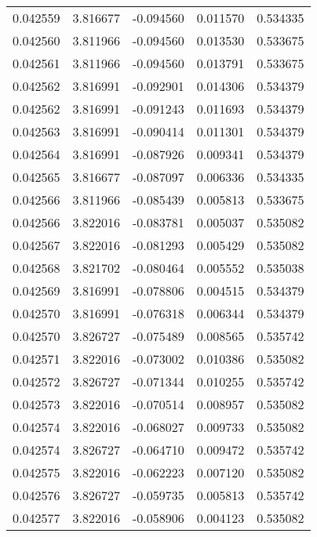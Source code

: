 \begin{tabular}{lrrrr}
0.042559    &  3.816677 & -0.094560 &  0.011570 &             0.534335 \\
0.042560    &  3.811966 & -0.094560 &  0.013530 &             0.533675 \\
0.042561    &  3.811966 & -0.094560 &  0.013791 &             0.533675 \\
0.042562    &  3.816991 & -0.092901 &  0.014306 &             0.534379 \\
0.042562    &  3.816991 & -0.091243 &  0.011693 &             0.534379 \\
0.042563    &  3.816991 & -0.090414 &  0.011301 &             0.534379 \\
0.042564    &  3.816991 & -0.087926 &  0.009341 &             0.534379 \\
0.042565    &  3.816677 & -0.087097 &  0.006336 &             0.534335 \\
0.042566    &  3.811966 & -0.085439 &  0.005813 &             0.533675 \\
0.042566    &  3.822016 & -0.083781 &  0.005037 &             0.535082 \\
0.042567    &  3.822016 & -0.081293 &  0.005429 &             0.535082 \\
0.042568    &  3.821702 & -0.080464 &  0.005552 &             0.535038 \\
0.042569    &  3.816991 & -0.078806 &  0.004515 &             0.534379 \\
0.042570    &  3.816991 & -0.076318 &  0.006344 &             0.534379 \\
0.042570    &  3.826727 & -0.075489 &  0.008565 &             0.535742 \\
0.042571    &  3.822016 & -0.073002 &  0.010386 &             0.535082 \\
0.042572    &  3.826727 & -0.071344 &  0.010255 &             0.535742 \\
0.042573    &  3.822016 & -0.070514 &  0.008957 &             0.535082 \\
0.042574    &  3.822016 & -0.068027 &  0.009733 &             0.535082 \\
0.042574    &  3.826727 & -0.064710 &  0.009472 &             0.535742 \\
0.042575    &  3.822016 & -0.062223 &  0.007120 &             0.535082 \\
0.042576    &  3.826727 & -0.059735 &  0.005813 &             0.535742 \\
0.042577    &  3.822016 & -0.058906 &  0.004123 &             0.535082 \\

\end{tabular}
